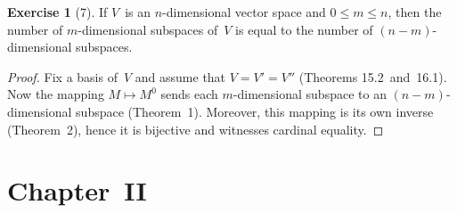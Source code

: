 \documentclass[letterpaper,12pt]{article}
\theoremstyle{definition}
\newtheorem*{exer}{Exercise}
\theoremstyle{remark}
\theoremstyle{direction}
\begin{document}
\begin{exer}[7]
If \(V\)~is an \(n\)-dimensional vector space and \(0\le m\le n\), then the number of \(m\)-dimensional subspaces of~\(V\) is equal to the number of \((n-m)\)-dimensional subspaces.
\end{exer}
\begin{proof}
Fix a basis of~\(V\) and assume that \(V=V'=V''\) (Theorems 15.2~and~16.1). Now the mapping \(M\mapsto M^0\) sends each \(m\)-dimensional subspace to an \((n-m)\)-dimensional subspace (Theorem~1). Moreover, this mapping is its own inverse (Theorem~2), hence it is bijective and witnesses cardinal equality.
\end{proof}

\section*{Chapter~II}
\end{document}
